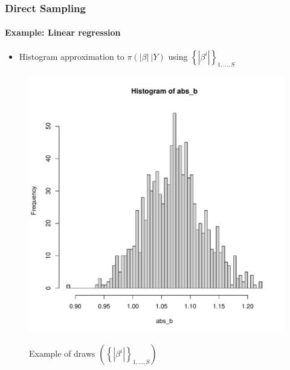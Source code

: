 \documentclass[
  shownotes,
  xcolor={svgnames},
  hyperref={colorlinks,citecolor=DarkBlue,linkcolor=DarkRed,urlcolor=DarkBlue}
  , aspectratio=169]{beamer}
\begin{document}
\begin{frame}[fragile]
\frametitle{Direct Sampling}  
\framesubtitle{Example: Linear regression}

\begin{itemize}
\item Histogram approximation to $\pi\left( \left| \beta \right|\ |Y \right)$ using $\left\{ \left| \beta^{i} \right| \right\}_{1,\ldots,S}$

  \end{itemize}

\begin{figure}[H] \centering
  \centering
  \caption{Example of draws $\left( \left\{ |\beta^{i}| \right\}_{1,\ldots,S} \right)$}
  \includegraphics[scale=0.25]{figures/hist}
  \\
  \tiny 
\end{figure}
\end{frame}
\end{document}
